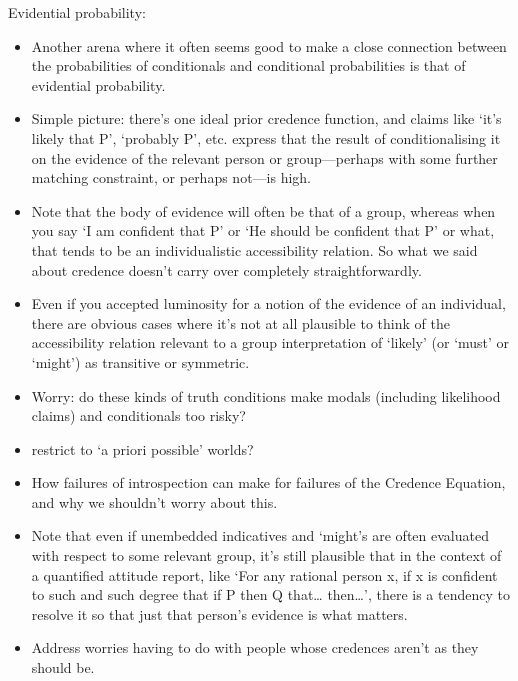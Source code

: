 \documentclass[If.tex]{subfiles}
\begin{document}
Evidential probability:
\begin{itemize}
	\item
	Another arena where it often seems good to make a close connection between the probabilities of conditionals and conditional probabilities is that of evidential probability.  
	\item
	Simple picture: there's one ideal prior credence function, and claims like ‘it's likely that P’, ‘probably P’, etc. express that the result of conditionalising it on the evidence of the relevant person or group---perhaps with some further matching constraint, or perhaps not---is high.  
	\item
	Note that the body of evidence will often be that of a group, whereas when you say ‘I am confident that P’ or ‘He should be confident that P’ or what, that tends to be an individualistic accessibility relation.  So what we said about credence doesn't carry over completely straightforwardly.  
	\item
	Even if you accepted luminosity for a notion of the evidence of an individual, there are obvious cases where it's not at all plausible to think of the accessibility relation relevant to a group interpretation of ‘likely’ (or ‘must’ or ‘might’) as transitive or symmetric.  
	\item
	Worry: do these kinds of truth conditions make modals (including likelihood claims) and conditionals too risky?  
\end{itemize}



\begin{itemize}
	\item
  restrict to ‘a priori possible’ worlds?
	\item
   How failures of introspection can make for failures of the Credence
   Equation, and why we shouldn't worry about this.
 	\item
	Note that even if unembedded indicatives and ‘might’s are often evaluated with respect to some relevant group, it's still plausible that in the context of a quantified attitude report, like ‘For any rational person x, if x is confident to such and such degree that if P then Q that\ldots{} then\ldots{}’, there is a tendency to resolve it so that just that person's evidence is what matters.
	\item
	Address worries having to do with people whose credences aren't as they should be.  
\end{itemize}
\end{document}
